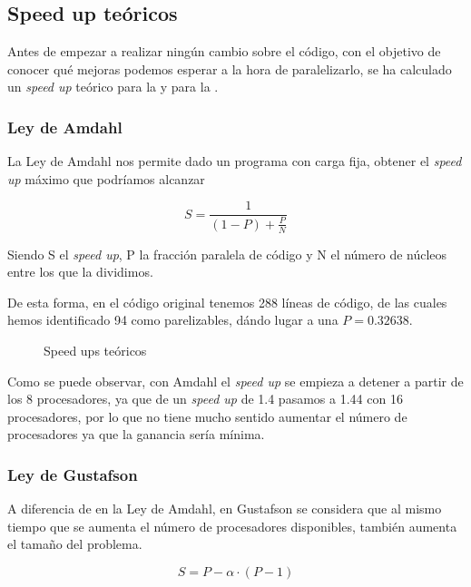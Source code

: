 \documentclass[12pt]{report} %
\begin{document}
\subsection{Speed up teóricos}

Antes de empezar a realizar ningún cambio sobre el código, con el objetivo de conocer qué mejoras
podemos esperar a la hora de paralelizarlo, se ha calculado un \textit{speed up} teórico para
la  y para la .

\subsubsection{Ley de Amdahl}
\label{sec:Amdahl}

La Ley de Amdahl nos permite dado un programa con carga fija, obtener el \textit{speed up} máximo que podríamos alcanzar

\[ S = \frac{1}{(1 - P) + \frac{P}{N}} \]

Siendo S el \textit{speed up}, P la fracción paralela de código y N el número de núcleos entre
los que la dividimos.

De esta forma, en el código original tenemos 288 líneas de código, de las cuales hemos identificado
94 como parelizables, dándo lugar a una $P = 0.32638$.

\begin{figure}[H]
    \makebox[\textwidth][c]{
        
    }
    \caption{Speed ups teóricos}
    \label{fig:ley_amdahl}
\end{figure}

Como se puede observar, con Amdahl el \textit{speed up} se empieza a detener a partir de los 8 procesadores,
ya que de un \textit{speed up} de 1.4 pasamos a 1.44 con 16 procesadores, por lo que no tiene mucho sentido
aumentar el número de procesadores ya que la ganancia sería mínima.


\subsubsection{Ley de Gustafson}
\label{sec:Gustafson}

A diferencia de en la Ley de Amdahl, en Gustafson se considera que al mismo tiempo que se aumenta el número
de procesadores disponibles, también aumenta el tamaño del problema.

\[ S = P - \alpha \cdot (P - 1)\]
\end{document}
